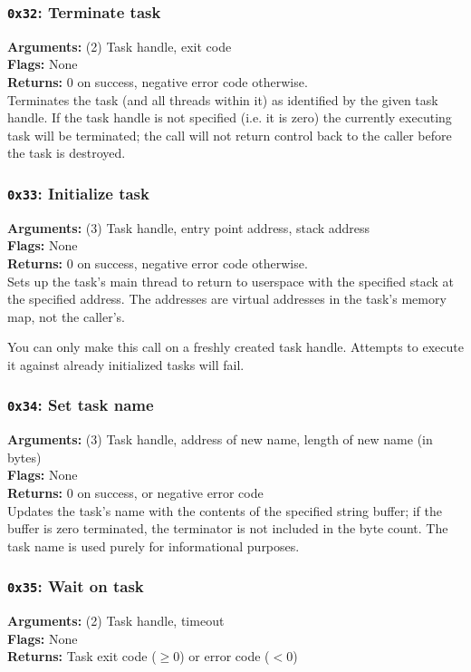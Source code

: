 \documentclass[11pt]{article}
\begin{document}
\subsubsection{{\tt 0x32}: Terminate task}
\textbf{Arguments:} (2) Task handle, exit code \\
\textbf{Flags:} None \\
\textbf{Returns:} 0 on success, negative error code otherwise. \\

Terminates the task (and all threads within it) as identified by the given task handle. If the task handle is not specified (i.e. it is zero) the currently executing task will be terminated; the call will not return control back to the caller before the task is destroyed.

\subsubsection{{\tt 0x33}: Initialize task}
\textbf{Arguments:} (3) Task handle, entry point address, stack address \\
\textbf{Flags:} None \\
\textbf{Returns:} 0 on success, negative error code otherwise. \\

Sets up the task's main thread to return to userspace with the specified stack at the specified address. The addresses are virtual addresses in the task's memory map, not the caller's.

You can only make this call on a freshly created task handle. Attempts to execute it against already initialized tasks will fail.

\subsubsection{{\tt 0x34}: Set task name}
\textbf{Arguments:} (3) Task handle, address of new name, length of new name (in bytes) \\
\textbf{Flags:} None \\
\textbf{Returns:} 0 on success, or negative error code \\

Updates the task's name with the contents of the specified string buffer; if the buffer is zero terminated, the terminator is not included in the byte count. The task name is used purely for informational purposes.

\subsubsection{{\tt 0x35}: Wait on task}
\textbf{Arguments:} (2) Task handle, timeout \\
\textbf{Flags:} None \\
\textbf{Returns:} Task exit code ($\geq0$) or error code ($<0$) \\
\end{document}
